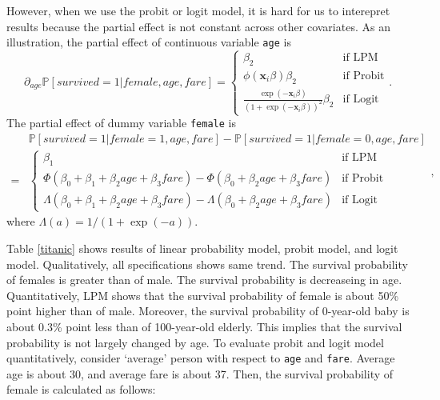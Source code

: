 \documentclass[
  12pt,
]{article}
\begin{document}
However, when we use the probit or logit model,
it is hard for us to interepret results
because the partial effect is not constant across other covariates.
As an illustration, the partial effect of continuous variable \texttt{age} is
\begin{equation*}
  \partial_{age} \mathbb{P}[survived = 1 | female, age, fare] =
  \begin{cases}
    \beta_2  &\text{if LPM}  \\
    \phi(\mathbf{x}_i \beta) \beta_2  &\text{if Probit}  \\
    \frac{\exp(-\mathbf{x}_i \beta)}{(1 + \exp(-\mathbf{x}_i \beta))^2} \beta_2 &\text{if Logit}
  \end{cases}.
\end{equation*}
The partial effect of dummy variable \texttt{female} is
\begin{equation*}
  \begin{split}
  &\mathbb{P}[survived = 1 | female = 1, age, fare] - \mathbb{P}[survived = 1 | female = 0, age, fare] \\
  =& 
  \begin{cases}
    \beta_1 &\text{if LPM}  \\
    \Phi(\beta_0 + \beta_1 + \beta_2 age + \beta_3 fare) - \Phi(\beta_0 + \beta_2 age + \beta_3 fare)  &\text{if Probit}  \\
    \Lambda(\beta_0 + \beta_1 + \beta_2 age + \beta_3 fare) - \Lambda(\beta_0 + \beta_2 age + \beta_3 fare)  &\text{if Logit}
  \end{cases}
  \end{split},
\end{equation*}
where \(\Lambda(a) = 1/(1 + \exp(-a))\).

Table \ref{titanic} shows results of linear probability model, probit model, and logit model.
Qualitatively, all specifications shows same trend.
The survival probability of females is greater than of male.
The survival probability is decreaseing in age.
Quantitatively, LPM shows that
the survival probability of female is about 50\% point higher than of male.
Moreover,
the survival probability of 0-year-old baby is about 0.3\% point less than of 100-year-old elderly.
This implies that the survival probability is not largely changed by age.
To evaluate probit and logit model quantitatively,
consider `average' person with respect to \texttt{age} and \texttt{fare}.
Average age is about 30, and average fare is about 37.
Then, the survival probability of female is calculated as follows:
\end{document}
